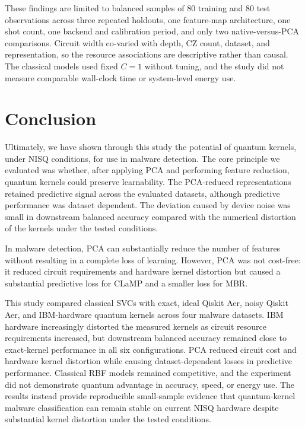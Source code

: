 \documentclass[letterpaper]{article} %
\begin{document}
These findings are limited to balanced samples of 80 training and 80 test observations across three repeated holdouts, one feature-map architecture, one shot count, one backend and calibration period, and only two native-versus-PCA comparisons. Circuit width co-varied with depth, CZ count, dataset, and representation, so the resource associations are descriptive rather than causal. The classical models used fixed $C=1$ without tuning, and the study did not measure comparable wall-clock time or system-level energy use.

\section{Conclusion}

Ultimately, we have shown through this study the potential of quantum kernels, under NISQ conditions, for use in malware detection. The core principle we evaluated was whether, after applying PCA and performing feature reduction, quantum kernels could preserve learnability. The PCA-reduced representations retained predictive signal across the evaluated datasets, although predictive performance was dataset dependent. The deviation caused by device noise was small in downstream balanced accuracy compared with the numerical distortion of the kernels under the tested conditions.

In malware detection, PCA can substantially reduce the number of features without resulting in a complete loss of learning. However, PCA was not cost-free: it reduced circuit requirements and hardware kernel distortion but caused a substantial predictive loss for CLaMP and a smaller loss for MBR.

This study compared classical SVCs with exact, ideal Qiskit Aer, noisy Qiskit Aer, and IBM-hardware quantum kernels across four malware datasets. IBM hardware increasingly distorted the measured kernels as circuit resource requirements increased, but downstream balanced accuracy remained close to exact-kernel performance in all six configurations. PCA reduced circuit cost and hardware kernel distortion while causing dataset-dependent losses in predictive performance. Classical RBF models remained competitive, and the experiment did not demonstrate quantum advantage in accuracy, speed, or energy use. The results instead provide reproducible small-sample evidence that quantum-kernel malware classification can remain stable on current NISQ hardware despite substantial kernel distortion under the tested conditions.
\end{document}
